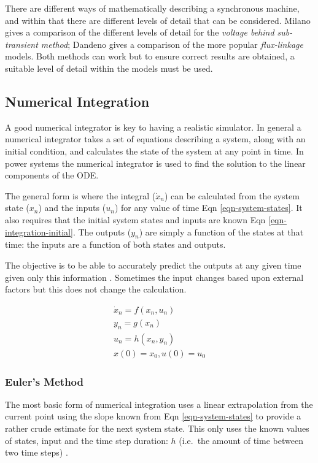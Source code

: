 \documentclass[a4paper,oneside,12pt]{report}
\begin{document}
There are different ways of mathematically describing a synchronous machine, and within that there are different levels of detail that can be considered. Milano \cite{Milano} gives a comparison of the different levels of detail for the \emph{voltage behind sub-transient method}; Dandeno \cite{IEEE2003} gives a comparison of the more popular \emph{flux-linkage} models. Both methods can work but to ensure correct results are obtained, a suitable level of detail within the models must be used.

\subsection{Numerical Integration}

A good numerical integrator is key to having a realistic simulator. In general a numerical integrator takes a set of equations describing a system, along with an initial condition, and calculates the state of the system at any point in time. In power systems the numerical integrator is used to find the solution to the linear components of the ODE.

The general form is where the integral ($\dot{x}_n$) can be calculated from the system state (${x}_n$) and the inputs ($u_n$) for any value of time Eqn \ref{eqn-system-states}. It also requires that the initial system states and inputs are known Eqn \ref{eqn-integration-initial}. The outputs ($y_n$) are simply a function of the states at that time: the inputs are a function of both states and outputs.

The objective is to be able to accurately predict the outputs at any given time given only this information \cite{Chang2006}. Sometimes the input changes based upon external factors but this does not change the calculation.

\begin{eqnarray}
\dot{x}_n = f( x_n, u_n ) \label{eqn-system-states}\\
y_n = g(x_n) \label{eqn-integration-output} \\
u_n = h(x_n, y_n) \label{eqn-integration-input} \\
x(0) = x_0, u(0) = u_0 \label{eqn-integration-initial}
\end{eqnarray}

\subsubsection{Euler's Method}

The most basic form of numerical integration uses a linear extrapolation from the current point using the slope known from Eqn \ref{eqn-system-states} to provide a rather crude estimate for the next system state. This only uses the known values of states, input and the time step duration: $h$ (i.e.\ the amount of time between two time steps) \cite{Lengyel2003}.
\end{document}
